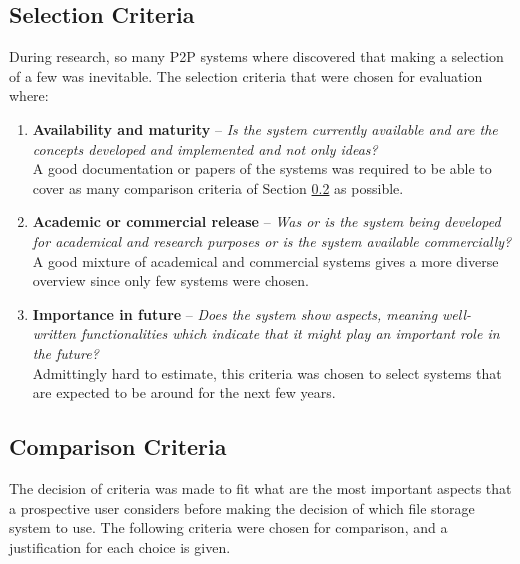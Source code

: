 \subsection{Selection Criteria}
During research, so many P2P systems where discovered that making a selection of a few was inevitable. The selection criteria that were chosen for evaluation where:
\begin{enumerate}
\item \textbf{Availability and maturity} -- \textit{Is the system currently available and are the concepts developed and implemented and not only ideas?}\\
A good documentation or papers of the systems was required to be able to cover as many comparison criteria of Section \ref{subsec:criteria} as possible.

\item \textbf{Academic or commercial release} -- \textit{Was or is the system being developed for academical and research purposes or is the system available commercially?}\\
A good mixture of academical and commercial systems gives a more diverse overview since only few systems were chosen.

\item \textbf{Importance in future} -- \textit{Does the system show aspects, meaning well-written functionalities which indicate that it might play an important role in the future?}\\
Admittingly hard to estimate, this criteria was chosen to select systems that are expected to be around for the next few years.
\end{enumerate}

\subsection{Comparison Criteria}
\label{subsec:criteria}
The decision of criteria was made to fit what are the most important aspects that a prospective user considers before making the decision of which file storage system to use. The following criteria were chosen for comparison, and a justification for each choice is given.

